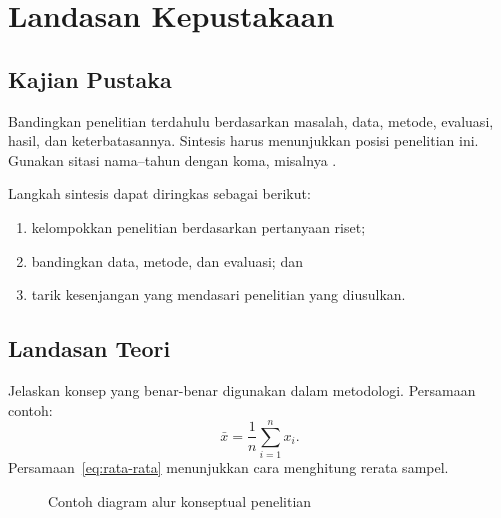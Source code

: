 \chapter{Landasan Kepustakaan}
\section{Kajian Pustaka}
Bandingkan penelitian terdahulu berdasarkan masalah, data, metode, evaluasi,
hasil, dan keterbatasannya. Sintesis harus menunjukkan posisi penelitian ini.
Gunakan sitasi nama--tahun dengan koma, misalnya \parencite{lamport1994latex}.

Langkah sintesis dapat diringkas sebagai berikut:
\begin{enumerate}
  \item kelompokkan penelitian berdasarkan pertanyaan riset;
  \item bandingkan data, metode, dan evaluasi; dan
  \item tarik kesenjangan yang mendasari penelitian yang diusulkan.
\end{enumerate}

\section{Landasan Teori}
Jelaskan konsep yang benar-benar digunakan dalam metodologi. Persamaan contoh:
\begin{equation}
  \bar{x}=\frac{1}{n}\sum_{i=1}^{n}x_i.
  \label{eq:rata-rata}
\end{equation}
Persamaan~\ref{eq:rata-rata} menunjukkan cara menghitung rerata sampel.

\begin{figure}[htbp]
  \centering
  \caption{Contoh diagram alur konseptual penelitian}
  \label{fig:alur-konseptual}
\end{figure}
